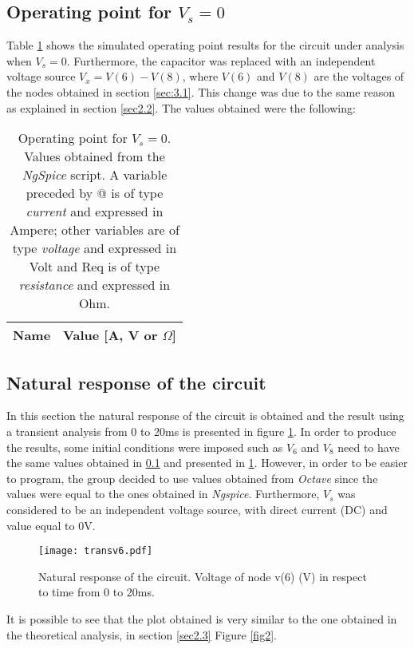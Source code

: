 \subsection{Operating point for $V_s=0$}
\label{sec:3.2}

Table \ref{op:tab_5} shows the simulated operating point results for the circuit under analysis when $V_s=0$. Furthermore, the capacitor was replaced with an independent voltage source $V_x=V(6)-V(8)$, where $V(6)$ and $V(8)$ are the voltages of the nodes obtained in section \ref{sec:3.1}. This change was due to the same reason as explained in section \ref{sec2.2}.
The values obtained were the following:

\begin{table}[h]
  \centering
  \def\arraystretch{1.2}
 
\begin{tabular}{c|c}
    \hline    
    \textbf{Name} & \textbf{Value [A, V or $\Omega$]} \\ \hline
    
    \hline
  \end{tabular}
  \captionsetup{justification=centering, margin=2cm}
  \caption{Operating point for $V_s=0$. Values obtained from the \emph{NgSpice} script. A variable preceded by @ is of type {\em current} and expressed in Ampere; other variables are of type {\it voltage} and expressed in Volt and Req is of type {\it resistance} and expressed in Ohm.}
  \label{op:tab_5}
\end{table}
\FloatBarrier

\clearpage
\subsection{Natural response of the circuit}
\label{sec:3.3}

In this section the natural response of the circuit is obtained and the result using a transient analysis from 0 to 20ms is presented in figure \ref{transv6}. In order to produce the results, some initial conditions were imposed such as $V_6$ and $V_8$ need to have the same values obtained in \ref{sec:3.2} and presented in \ref{op:tab_5}. However, in order to be easier to program, the group decided to use values obtained from \emph{Octave} since the values were equal to the ones obtained in \emph{Ngspice}. Furthermore, $V_s$ was considered to be an independent voltage source, with direct current (DC) and value equal to 0V.

\begin{figure}[!htp] \centering
\texttt{[image: transv6.pdf]}
\captionsetup{justification=centering, margin=2cm}
\caption{Natural response of the circuit. Voltage of node v(6) (V) in respect to time from 0 to 20ms.}
\label{transv6}
\end{figure}
\FloatBarrier
It is possible to see that the plot obtained is very similar to the one obtained in the theoretical analysis, in section \ref{sec2.3} Figure \ref{fig2}.
\clearpage
